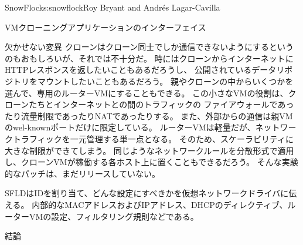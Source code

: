 \begin{aosachapter}{SnowFlock}{s:snowflock}{Roy Bryant and Andr\'e{s} Lagar-Cavilla}
\begin{aosasect1}{VMクローニングアプリケーションのインターフェイス}
\begin{aosasect2}{欠かせない変異}
クローンはクローン同士でしか通信できないようにするというのもおもしろいが、それでは不十分だ。
時にはクローンからインターネットにHTTPレスポンスを返したいこともあるだろうし、
公開されているデータリポジトリをマウントしたいこともあるだろう。
親やクローンの中からいくつかを選んで、専用のルーターVMにすることもできる。
この小さなVMの役割は、クローンたちとインターネットとの間のトラフィックの
ファイアウォールであったり流量制限であったりNATであったりする。
また、外部からの通信は親VMのwel-knownポートだけに限定している。
ルーターVMは軽量だが、ネットワークトラフィックを一元管理する単一点となる。
そのため、スケーラビリティに大きな制限ができてしまう。
同じようなネットワークルールを分散形式で適用し、クローンVMが稼働する各ホスト上に置くこともできるだろう。
そんな実験的なパッチは、まだリリースしていない。

SFLDはIDを割り当て、どんな設定にすべきかを仮想ネットワークドライバに伝える。
内部的なMACアドレスおよびIPアドレス、DHCPのディレクティブ、ルーターVMの設定、フィルタリング規則などである。

\end{aosasect2}

\end{aosasect1}

\begin{aosasect1}{結論}


\end{aosasect1}
\end{aosachapter}
